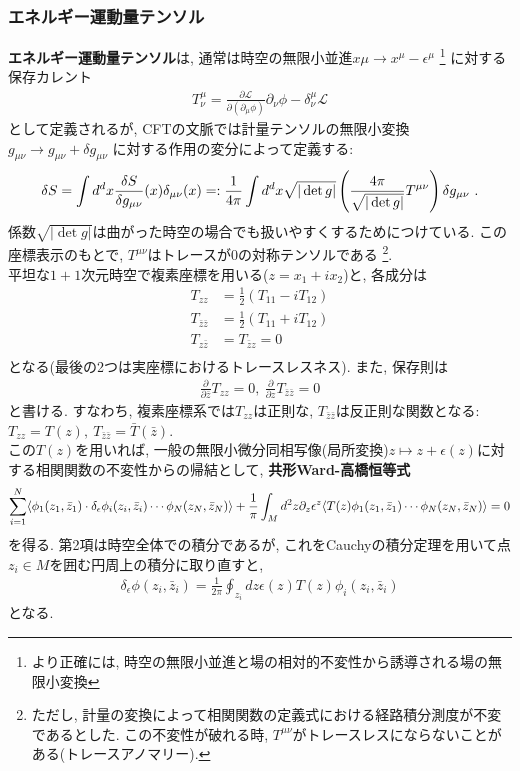 \subsubsection{エネルギー運動量テンソル}
\textbf{エネルギー運動量テンソル}は, 通常は時空の無限小並進$x\mu\to x^\mu-\epsilon^\mu$
\footnote{より正確には, 時空の無限小並進と場の相対的不変性から誘導される場の無限小変換}
に対する保存カレント
\begin{align}
    T^{\mu}_\nu = \frac{\partial\mathcal{L}}{\partial(\partial_\mu \phi)}\partial_\nu \phi - \delta^\mu_\nu \mathcal{L}
\end{align}
として定義されるが, CFTの文脈では計量テンソルの無限小変換
$g_{\mu\nu}\to g _{\mu\nu} + \delta g_{\mu\nu}$
に対する作用の変分によって定義する: 
\begin{align}
    \delta S = \int d^d x \frac{\delta S}{\delta g_{\mu\nu}}(x)\delta_{\mu\nu}(x)
    =: \frac{1}{4\pi}\int d^d x \sqrt{|\det g|}\left({\frac{4\pi}{\sqrt{|\det g|}}T^{\mu\nu}}\right)\delta g_{\mu\nu}~. 
\end{align}
係数$\sqrt{|\det g|}$は曲がった時空の場合でも扱いやすくするためにつけている. 
この座標表示のもとで, $T^{\mu\nu}$はトレースが$0$の対称テンソルである
\footnote{ただし, 計量の変換によって相関関数の定義式における経路積分測度が不変であるとした. 
この不変性が破れる時, $T^{\mu\nu}$がトレースレスにならないことがある(トレースアノマリー). }. \\
平坦な$1+1$次元時空で複素座標を用いる($z=x_1 + ix_2$)と, 各成分は
\begin{align}
    T_{zz} &= \frac{1}{2}(T_11 - iT_{12})\\
    T_{\bar{z}\bar{z}} &= \frac{1}{2}(T_11+iT_{12})\\
    T_{z\bar{z}}&=T_{\bar{z}z}=0\\
\end{align}
となる(最後の2つは実座標におけるトレースレスネス). 
また, 保存則は
\begin{align}
    \frac{\partial}{\partial \bar{z}}T_{zz}=0, ~\frac{\partial}{\partial z}T_{\bar{z}\bar{z}}=0
\end{align}
と書ける. すなわち, 複素座標系では$T_{zz}$は正則な, $T_{\bar{z}\bar{z}}$は反正則な関数となる: 
$T_{zz}=T(z), ~ T_{\bar{z}\bar{z}}=\bar{T}(\bar{z})$. \\
この$T(z)$を用いれば, 
一般の無限小微分同相写像(局所変換)$z\mapsto z + \epsilon(z)$に対する相関関数の不変性からの帰結として, 
\textbf{共形Ward-高橋恒等式}
\begin{align}
    \label{CWT}
    \sum_{i=1}^{N}\langle{\phi_1(z_1, \bar{z}_1)\cdot \delta_\epsilon\phi_i(z_i, \bar{z}_i)\cdots \phi_N(z_N, \bar{z}_N)}\rangle
    +\frac{1}{\pi}\int_{M} d^2 z \partial_z \epsilon^z \langle T(z) \phi_1(z_1, \bar{z}_1)\cdots \phi_N(z_N, \bar{z}_N)\rangle
    =0
\end{align}
を得る. 第2項は時空全体での積分であるが, これをCauchyの積分定理を用いて点$z_i\in M$を囲む円周上の積分に取り直すと, 
\begin{align}
    \delta_\epsilon \phi(z_i, \bar{z}_i) = \frac{1}{2\pi}\oint_{z_i}dz \epsilon(z)T(z)\phi_i(z_i, \bar{z}_i)
\end{align}
となる. 
